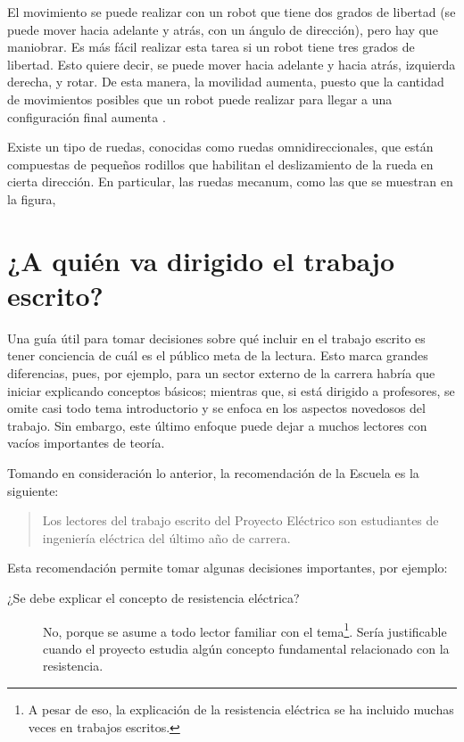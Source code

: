 El movimiento se puede realizar con un robot que tiene dos grados de libertad (se puede mover hacia adelante y atrás, con un ángulo de dirección), pero hay que maniobrar. Es más fácil realizar esta tarea si un robot tiene tres grados de libertad. Esto quiere decir, se puede mover hacia adelante y hacia atrás, izquierda derecha, y rotar. De esta manera, la movilidad aumenta, puesto que la cantidad de movimientos posibles que un robot puede realizar para llegar a una configuración final aumenta \cite{Batlle2009}.

Existe un tipo de ruedas, conocidas como ruedas omnidireccionales, que están compuestas de pequeños rodillos que habilitan el deslizamiento de la rueda en cierta dirección. En particular, las ruedas mecanum, como las que se muestran en la figura, 


\section{¿A quién va dirigido el trabajo escrito?}
  
Una guía útil para tomar decisiones sobre qué incluir en el trabajo escrito es tener conciencia de cuál es el público meta de la lectura. Esto marca grandes diferencias, pues, por ejemplo, para un sector externo de la carrera habría que iniciar explicando conceptos básicos; mientras que, si está dirigido a profesores, se omite casi todo tema introductorio y se enfoca en los aspectos novedosos del trabajo. Sin embargo, este último enfoque puede dejar a muchos lectores con vacíos importantes de teoría.

Tomando en consideración lo anterior, la recomendación de la Escuela es la siguiente:

\begin{quote}
Los lectores del trabajo escrito del Proyecto Eléctrico son estudiantes de ingeniería eléctrica del último año de carrera.
\end{quote}

Esta recomendación permite tomar algunas decisiones importantes, por ejemplo:

\begin{description}
\item[¿Se debe explicar el concepto de resistencia eléctrica?] No, porque se asume a todo lector familiar con el tema\footnote{A pesar de eso, la explicación de la resistencia eléctrica se ha incluido muchas veces en trabajos escritos.}. Sería justificable cuando el proyecto estudia algún concepto fundamental relacionado con la resistencia.
\end{description}

